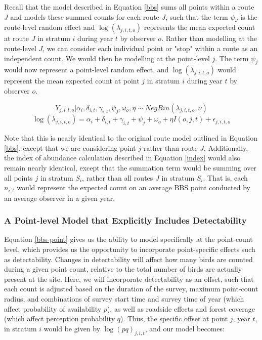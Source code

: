 \documentclass[12pt]{article}
\begin{document}
\par Recall that the model described in Equation \ref{bbs} sums all points within a route $J$ and models these summed counts for each route $J$, such that the term $\psi_J$ is the route-level random effect and $\log(\lambda_{j,i,t,o})$ represents the mean expected count at route $J$ in stratum $i$ during year $t$ by observer $o$.
Rather than modelling at the route-level $J$, we can consider each individual point or "stop" within a route as an independent count.
We would then be modelling at the point-level $j$.
The term $\psi_j$ would now represent a point-level random effect, and $\log(\lambda_{j,i,t,o})$ would represent the mean expected count at point $j$ in stratum $i$ during year $t$ by observer $o$. 

\begin{equation*}
	Y_{j,i,t,o} | \alpha_i, \delta_{i,t}, \gamma_{i,t}, \psi_j, \omega_o, \eta \sim NegBin(\lambda_{j,i,t,o}, \nu)
\end{equation*}
\begin{equation}\label{bbs-point}
	\log(\lambda_{j,i,t,o}) = \alpha_i + \delta_{i,t} + \gamma_{i,t} + \psi_j + \omega_o + \eta I(o,j,t) + \epsilon_{j,i,t,o}
\end{equation}

Note that this is nearly identical to the original route model outlined in Equation \ref{bbs}, except that we are considering point $j$ rather than route $J$.
Additionally, the index of abundance calculation described in Equation \ref{index} would also remain nearly identical, except that the summation term would be summing over all points $j$ in stratum $S_i$, rather than all routes $J$ in stratum $S_i$. 
That is, each $n_{i,t}$ would represent the expected count on an average BBS point conducted by an average observer in a given year.

\subsubsection{A Point-level Model that Explicitly Includes Detectability}

\par Equation \ref{bbs-point} gives us the ability to model specifically at the point-count level, which provides us the opportunity to incorporate point-specific effects such as detectability.
Changes in detectability will affect how many birds are counted during a given point count, relative to the total number of birds are actually present at the site. 
Here, we will incorporate detectability as an offset, such that each count is adjusted based on the duration of the survey, maximum point-count radius, and combinations of survey start time and survey time of year (which affect probability of availability $p$), as well as roadside effects and forest coverage (which affect perception probability $q$). 
Thus, the specific offset at point $j$, year $t$, in stratum $i$ would be given by $\log(p q)_{j,i,t}$, and our model becomes:
\end{document}
